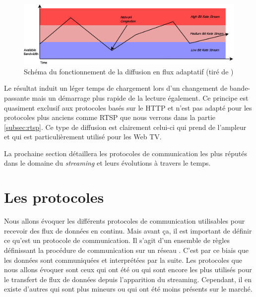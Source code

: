 \documentclass{polytech/polytech}
\begin{document}
\begin{figure}
	\includegraphics[scale=0.25]{images/Adaptive_streaming_overview.png}
	\caption{Schéma du fonctionnement de la diffusion en flux adaptatif (tiré de \cite{_adaptive_2017})}
	\label{fig:adaptive_bitrate}
\end{figure}

Le résultat induit un léger temps de chargement lors d’un changement de bande-passante mais un démarrage plus rapide de la lecture également. Ce principe est quasiment exclusif aux protocoles basés sur le HTTP et n’est pas adapté pour les protocoles plus anciens comme RTSP que nous verrons dans la partie \autoref{subsec:rtsp}. Ce type de diffusion est clairement celui-ci qui prend de l’ampleur et qui est particulièrement utilisé pour les Web TV.

La prochaine section détaillera les protocoles de communication les plus réputés dans le domaine du \textit{streaming} et leurs évolutions à travers le temps.


\section{Les protocoles}
\label{sec:protocoles}

Nous allons évoquer les différents protocoles de communication utilisables pour recevoir des flux de données en continu. Mais avant ça, il est important de définir ce qu’est un protocole de communication. Il s’agit d’un ensemble de règles définissant la procédure de communication sur un réseau \cite{_introduction_2017}. C’est par ce biais que les données sont communiquées et interprétées par la suite. Les protocoles que nous allons évoquer sont ceux qui ont été ou qui sont encore les plus utilisés pour le transfert de flux de données depuis l’apparition du streaming. Cependant, il en existe d’autres qui sont plus mineurs ou qui ont été moins présents sur le marché.
\end{document}
